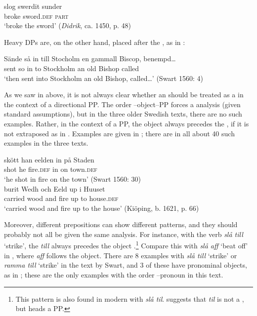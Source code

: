 \documentclass[output=paper]{langscibook}
\begin{document}
\ex
\gll  slog     swerdit     sunder \\
    broke   sword\textsc{.def}   \textsc{part}\\
\glt `broke the sword’ (\textit{Didrik}, ca. 1450, p. 48)\\
\z
\z


Heavy DPs are, on the other hand, placed after the , as in :


\ea\label{ex:lalu:24}
\gll  Sände   så  in   till   Stocholm     en   gammall   Biscop,   benempd…\\
sent       so    in   to     Stockholm     an   old       Bishop   called\\
\glt `then sent into Stockholm an old Bishop, called…’ (Swart 1560: 4)\\
\z


As we saw in  above, it is not always clear whether an  should be treated as a  in the context of a directional PP. The order –object–PP forces a  analysis (given standard assumptions), but in the three older Swedish texts, there are no such examples. Rather, in the context of a PP, the object always precedes the , if it is not extraposed as in . Examples are given in ; there are in all about 40 such examples in the three texts.


\ea\label{ex:lalu:25}
\ea\label{ex:lalu:25a}
\gll  skött  han   eelden     in     på   Staden\\
    shot     he   fire\textsc{.def}     in   on   town\textsc{.def} \\
\glt `he shot in fire on the town’ (Swart 1560: 30)\\

\ex\label{ex:lalu:25b}
\gll  burit     Wedh   och   Eeld   up   i   Huuset \\
    carried   wood   and   fire   up   to   house\textsc{.def}\\
\glt `carried wood and fire up to the house’ (Kiöping, b. 1621, p. 66)\\
\z
\z


Moreover, different prepositions can show different patterns, and they should probably not all be given the same analysis. For instance, with the  verb \textit{slå till} ‘strike’, the  \textit{till} always precedes the object .\footnote{This pattern is also found in modern  with \textit{slå til}. \citet{Tungseth2006} suggests that \textit{til} is not a , but heads a PP.} Compare this with \textit{slå aff} ‘beat off’ in , where \textit{aff} follows the object. There are 8 examples with \textit{slå till} ‘strike’ or \textit{ramma till} ‘strike’ in the text by Swart, and 3 of these have pronominal objects, as in ; these are the only examples with the order –pronoun in this text.
\end{document}
